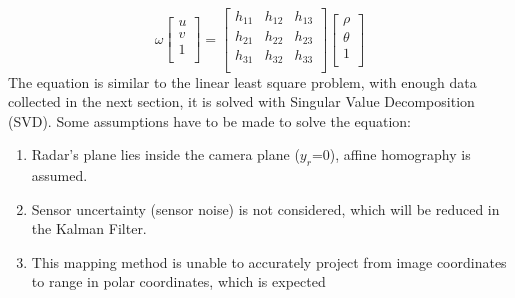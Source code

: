 \begin{equation}\label{equ:homography_eq}
    \omega
    \begin{bmatrix}
        u\\
        v\\
        1\\
        \end{bmatrix}=
    \begin{bmatrix}  
        h_{11} & h_{12} & h_{13}\\
        h_{21} & h_{22} & h_{23}\\
        h_{31} & h_{32} & h_{33}\\
    \end{bmatrix}  
    \begin{bmatrix}
    {\rho}\\
    {\theta}\\
    1\\
    \end{bmatrix}
\end{equation}
The equation is similar to the linear least square problem,
with enough data collected in the next section, it is solved with Singular Value Decomposition (SVD).
Some assumptions have to be made to solve the equation:
\begin{enumerate}
    \item Radar's plane lies inside the camera plane ($y_r$=0), affine homography is assumed.
    \item Sensor uncertainty (sensor noise) is not considered, which will be reduced in the Kalman Filter.
    \item This mapping method is unable to accurately project from image coordinates to range in polar coordinates, 
            which is expected
\end{enumerate}

\iffalse
